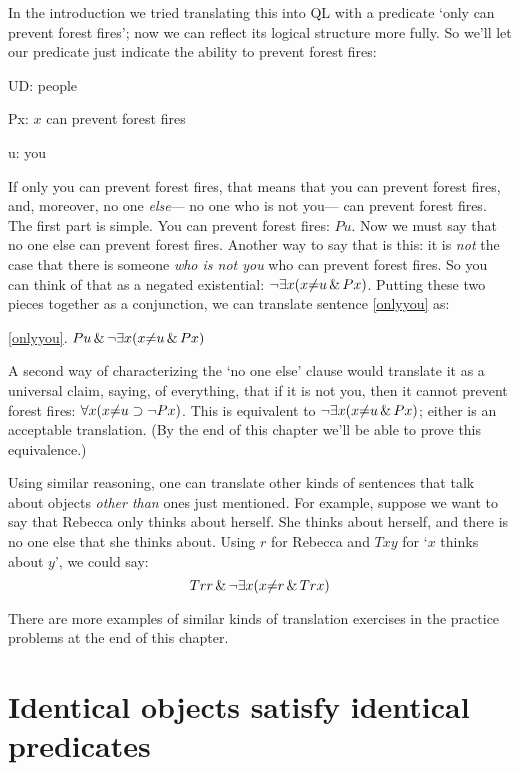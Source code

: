 In the introduction we tried translating this into QL with a predicate `only  \blank can prevent forest fires'; now we can reflect its logical structure more fully. So we'll let our predicate just indicate the ability to prevent forest fires:

\begin{ekey}
\item[UD:] people
\item[Px:] $x$ can prevent forest fires
\item[u:] you
\end{ekey}

If only you can prevent forest fires, that means that you can prevent forest fires, and, moreover, no one \emph{else}--- no one who is not you--- can prevent forest fires. The first part is simple. You can prevent forest fires: $Pu$. Now we must say that no one else can prevent forest fires. Another way to say that is this: it is \emph{not} the case that there is someone \emph{who is not you} who can prevent forest fires. So you can think of that as a negated existential: $\neg \exists x (x {\neq} u \,\&\, Px)$. Putting these two pieces together as a conjunction, we can translate sentence \ref{onlyyou} as:

\begin{earg}
\item[\ref{onlyyou}.] $Pu \,\&\, \neg \exists x (x {\neq} u \,\&\, Px)$
\end{earg}

A second way of characterizing the `no one else' clause would translate it as a universal claim, saying, of everything, that if it is not you, then it cannot prevent forest fires: $\forall x (x {\neq} u \supset \neg Px)$. This is equivalent to $\neg \exists x (x {\neq} u \,\&\, Px)$; either is an acceptable translation. (By the end of this chapter we'll be able to prove this equivalence.)

Using similar reasoning, one can translate other kinds of sentences that talk about objects \emph{other than} ones just mentioned. For example, suppose we want to say that Rebecca only thinks about herself. She thinks about herself, and there is no one else that she thinks about. Using $r$ for Rebecca and $Txy$ for `$x$ thinks about $y$', we could say: $$Trr \,\&\, \neg \exists x (x {\neq} r \,\&\, Trx)$$

There are more examples of similar kinds of translation exercises in the practice problems at the end of this chapter.

\section{Identical objects satisfy identical predicates}

